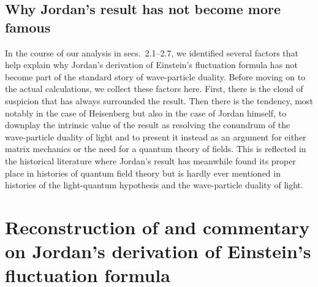 \documentclass[12pt]{elsart}
\begin{document}
\subsection{Why Jordan's result has not become more famous}

In the course of our analysis in secs.\ 2.1--2.7, we identified several factors that help explain why Jordan's derivation of Einstein's fluctuation formula has not become part of the standard story of wave-particle duality. Before moving on to the actual calculations, we collect these factors here. First, there is the cloud of suspicion that has always surrounded the result. Then there is the tendency, most notably in the case of Heisenberg but also in the case of Jordan himself, to downplay the intrinsic value of the result as resolving the conundrum of the wave-particle duality of light and to present it instead as an argument for either matrix mechanics or the need for a quantum theory of fields. This is reflected in the historical literature where Jordan's result has meanwhile found its proper place in histories of quantum field theory but is hardly ever mentioned in histories of the light-quantum hypothesis and the wave-particle duality of light.

\section{Reconstruction of and commentary on Jordan's derivation of Einstein's fluctuation formula}
\end{document}
